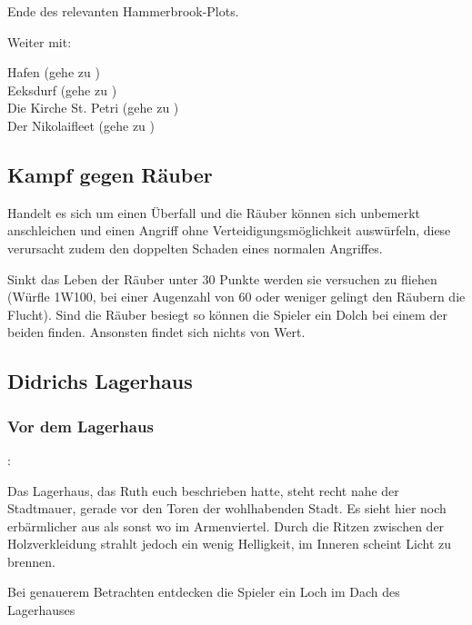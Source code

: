 Ende des relevanten Hammerbrook-Plots.

Weiter mit:

Hafen (gehe zu \blue{\ref{Hafen}}) \\
Eeksdurf (gehe zu \blue{\ref{xd}}) \\
Die Kirche St. Petri (gehe zu \blue{\ref{Petri}}) \\
Der Nikolaifleet (gehe zu \blue{\ref{Fleet}}) \\

\subsection{Kampf gegen Räuber}
\label{kampf2}

Handelt es sich um einen Überfall und die Räuber können sich unbemerkt anschleichen und einen Angriff ohne Verteidigungsmöglichkeit auswürfeln, diese verursacht zudem den doppelten Schaden eines normalen Angriffes.

\begin{center}
  
\end{center}

Sinkt das Leben der Räuber unter 30 Punkte werden sie versuchen zu fliehen (Würfle 1W100, bei einer Augenzahl von 60 oder weniger gelingt den Räubern die Flucht).
Sind die Räuber besiegt so können die Spieler ein Dolch bei einem der beiden finden. Ansonsten findet sich nichts von Wert.

\subsection{Didrichs Lagerhaus}
\label{Lagerhaus}

\subsubsection{Vor dem Lagerhaus}

:

Das Lagerhaus, das Ruth euch beschrieben hatte, steht recht nahe der Stadtmauer, gerade vor den Toren der wohlhabenden Stadt. Es sieht hier noch erbärmlicher aus als sonst wo im Armenviertel. Durch die Ritzen zwischen der Holzverkleidung strahlt jedoch ein wenig Helligkeit, im Inneren scheint Licht zu brennen.

Bei genauerem Betrachten entdecken die Spieler ein Loch im Dach des Lagerhauses


